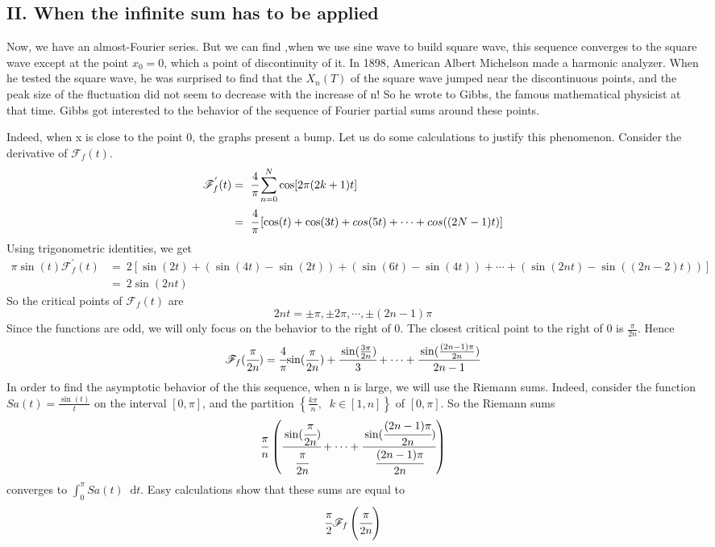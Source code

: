 \documentclass[margin,line]{res}
\newcommand*{\dif}{\mathop{}\!\mathrm{d}}
\begin{document}
\begin{resume}
\section{\sc II. When the infinite sum has to be applied}
Now, we have an almost-Fourier series. But we can find ,when we use sine wave to build square wave, this sequence converges to the square wave except at the point $x_0 = 0$, which a point of discontinuity of it. In 1898, American Albert Michelson made a harmonic analyzer. When he tested the square wave, he was surprised to find that the $X_n(T)$ of the square wave jumped near the discontinuous points, and the peak size of the fluctuation did not seem to decrease with the increase of n! So he wrote to Gibbs, the famous mathematical physicist at that time. Gibbs got interested to the behavior of the sequence of Fourier partial sums around these points. \par
Indeed, when x is close to the point 0, the graphs present a bump. Let us do some calculations to justify this phenomenon. Consider the derivative of $\mathscr{F}_f(t)$.
\begin{align}
\mathscr{F}^{'}_f(t) 
	&= \ \cfrac{4}{\pi} \sum\limits_{n=0}^N{\cos [2\pi (2k+1)t]} \nonumber \\
	&= \ \cfrac{4}{\pi} \left[ \cos(t) + \cos(3t) + cos(5t) + \cdots + cos((2N-1)t) \right] \nonumber 
\end{align}
Using trigonometric identities, we get 
\begin{align}
\pi\sin(t) \mathscr{F}^{'}_f(t) 
	&= \ 2\left[ \sin(2t) + (\sin(4t)-\sin(2t)) + (\sin(6t)-\sin(4t)) + \cdots + (\sin(2nt)-\sin((2n-2)t))\right] \nonumber \\
	&= \ 2\sin(2nt) \nonumber
\end{align}
So the critical points of $\mathscr{F}_f(t)$ are 
$$
2nt = \pm\pi , \pm 2\pi,\cdots,\pm (2n-1)\pi
$$
Since the functions are odd, we will only focus on the behavior to the right of 0. The closest critical point to the right of 0 is $\frac{\pi}{2n}$. Hence 
$$
\mathscr{F}_f(\cfrac{\pi}{2n}) = \cfrac{4}{\pi} {
	\sin(\frac{\pi}{2n}) + \cfrac{\sin(\frac{3\pi}{2n})}{3} + \cdots +
	\cfrac{\sin(\frac{(2n-1)\pi}{2n})}{2n-1}
}
$$
In order to find the asymptotic behavior of the this sequence, when n is large, we will use the Riemann sums. Indeed, consider the function $Sa(t) = \frac{\sin(t)}{t}$ on the interval $[0,\pi]$, and the partition $\left\{{\frac{k\pi}{n}}, \;\;k \in [1,n]\right\}$ of $[0,\pi]$. So the Riemann sums
$$
\frac{\pi}{n}
\left(
	\cfrac{\sin(\cfrac{\pi}{2n})}{\cfrac{\pi}{2n}} + \cdots +
	\cfrac{\sin(\cfrac{(2n-1)\pi}{2n})}{\cfrac{(2n-1)\pi}{2n}}
\right)
$$
converges to $\int_{0}^{\pi} Sa(t) \dif t$. Easy calculations show that these sums are equal to 
$$
\cfrac{\pi}{2}{\mathscr{F}_f \left( \cfrac{\pi}{2n} \right) }
$$


\end{resume}
\end{document}
